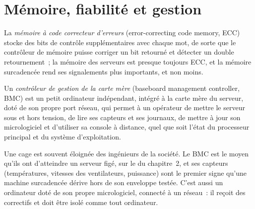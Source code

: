 \section{Mémoire, fiabilité et gestion}

\begin{definition}\label{def:nw:servers:ecc}
La \emph{mémoire à code correcteur d'erreurs} (error-correcting code memory, ECC) stocke des bits de contrôle supplémentaires avec chaque mot, de sorte que le
contrôleur de mémoire puisse corriger un bit retourné et détecter un double retournement~; la mémoire des serveurs est presque toujours ECC, et la mémoire surcadencée rend ses
signalements plus importants, et non moins.
\end{definition}

\begin{definition}\label{def:nw:servers:bmc}
Un \emph{contrôleur de gestion de la carte mère} (baseboard management controller, BMC) est un petit ordinateur indépendant, intégré à la carte mère du serveur,
doté de son propre port réseau, qui permet à un opérateur de mettre le serveur sous et hors tension, de lire ses capteurs et ses journaux, de mettre à jour son micrologiciel
et d'utiliser sa console à distance, quel que soit l'état du processeur principal et du système d'exploitation.
\end{definition}

Une cage est souvent éloignée des ingénieurs de la société. Le BMC est le moyen qu'ils ont d'atteindre un serveur figé, sur le
 du chapitre~2, et ses capteurs (températures, vitesses des ventilateurs, puissance) sont le premier signe qu'une machine surcadencée
dérive hors de son enveloppe testée. C'est aussi un ordinateur doté de son propre micrologiciel, connecté à un réseau~: il reçoit des correctifs et doit être isolé comme tout ordinateur.

